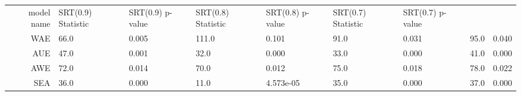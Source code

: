 \begin{tabular}{|r|l|l|l|l|l|l|}
  \hline
  model name & SRT(0.9) Statistic & SRT(0.9) p-value & SRT(0.8) Statistic & SRT(0.8) p-value & SRT(0.7) Statistic & SRT(0.7) p-value \\ 
  WAE & 66.0 & 0.005 & 111.0 & 0.101 & 91.0 & 0.031 & 95.0 & 0.040 \\ 
  AUE & 47.0 & 0.001 & 32.0 & 0.000 & 33.0 & 0.000 & 41.0 & 0.000 \\ 
  AWE & 72.0 & 0.014 & 70.0 & 0.012 & 75.0 & 0.018 & 78.0 & 0.022 \\ 
  SEA & 36.0 & 0.000 & 11.0 & 4.573e-05 & 35.0 & 0.000 & 37.0 & 0.000 \\ 
\end{tabular}

